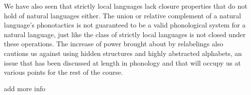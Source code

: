 We have also seen that strictly local languages lack closure properties that do not hold of natural languages either.
The union or relative complement of a natural language's phonotactics is not guaranteed to be a valid phonological system for a natural language, just like the class of strictly local languages is not closed under these operations.
The increase of power brought about by relabelings also cautions us against using hidden structures and highly abstracted alphabets, an issue that has been discussed at length in phonology and that will occupy us at various points for the rest of the course.



\begin{literature}
add more info
\end{literature}

